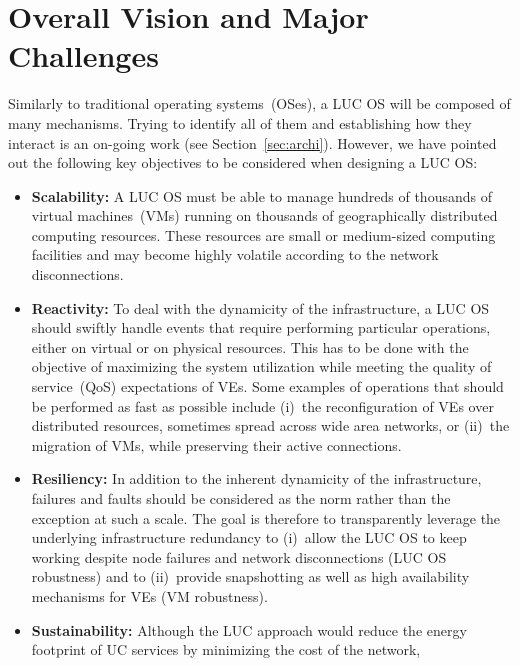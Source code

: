 \vspace*{-.5cm}
\section{Overall Vision and Major Challenges\label{sec:challenges}}

Similarly to traditional operating systems~(OSes), a LUC OS will be composed of
many mechanisms. Trying to identify all of them and establishing how they
interact is an on-going work (see Section~\ref{sec:archi}). However,
we have pointed out the following
key objectives to be considered when designing a LUC OS:

\begin{itemize} 
\item \textbf{Scalability:} A LUC OS must be able to manage hundreds of
  thousands of virtual machines~(VMs) running on thousands of 
  geographically distributed computing resources.  These resources are small or
  medium-sized computing facilities and may become highly volatile according to the network disconnections.  
\item \textbf{Reactivity:} To deal with the dynamicity of the infrastructure, a LUC OS
  should swiftly handle events that require performing particular
  operations, either on virtual or on physical resources. This has to be done with the
  objective of maximizing the system utilization while meeting the quality of service~(QoS) expectations of VEs. 
  Some examples of operations that should be performed as fast as possible include (i)~the reconfiguration
  of VEs over distributed resources, sometimes spread across wide area networks, or (ii)~the migration of VMs, 
  while preserving their active connections.
\item \textbf{Resiliency:} In addition to the inherent dynamicity of the
  infrastructure, failures and faults should be considered as the norm rather than the
exception at such a scale. The goal is therefore to transparently leverage the
underlying infrastructure redundancy to (i)~allow the LUC OS to keep
working despite node failures and network disconnections (LUC OS robustness) and to (ii)~provide
snapshotting as well as high availability mechanisms for VEs (VM robustness).
\item \textbf{Sustainability:} Although the LUC approach would reduce the energy
footprint of UC services by minimizing the cost of the network, 

\end{itemize}
